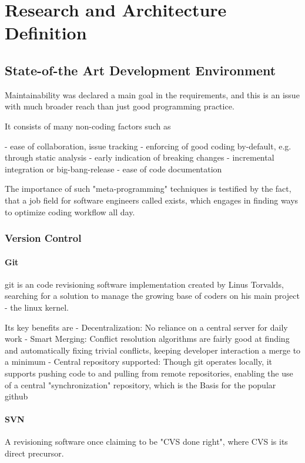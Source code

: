 \chapter{Research and Architecture Definition}

\section{State-of-the Art Development Environment}

Maintainability was declared a main goal in the requirements, and this is an issue with much broader reach than just good programming practice.

It consists of many non-coding factors such as

- ease of collaboration, issue tracking
- enforcing of good coding by-default, e.g. through static analysis
- early indication of breaking changes
- incremental integration or big-bang-release
- ease of code documentation

The importance of such "meta-programming" techniques is testified by the fact, that a job field for software engineers called  exists, which engages in finding ways to optimize coding workflow all day.

\subsection{Version Control}

\subsubsection{Git}
\gls{git} is an code revisioning software implementation created by Linus Torvalds, searching for a solution to manage the growing base of coders on his main project - the \gls{linux} kernel.

Its key benefits are
- Decentralization: No reliance on a central server for daily work
- Smart Merging: Conflict resolution algorithms are fairly good at finding and automatically fixing trivial conflicts, keeping developer interaction a merge to a minimum
- Central repository supported: Though git operates locally, it supports pushing code to and pulling from remote repositories, enabling the use of a central "synchronization" repository, which is the Basis for the popular \gls{github} 

\subsubsection{SVN}
A revisioning software once claiming to be "CVS done right", where CVS is its direct precursor.

